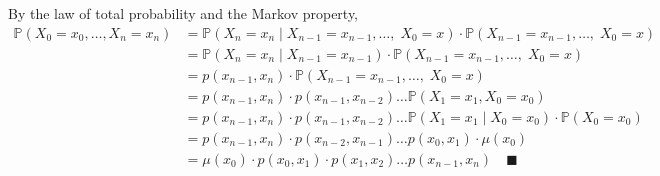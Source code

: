 \documentclass[11pt,letterpaper, leqno]{article}
\numberwithin{equation}{section}
\numberwithin{theorem}{section}
\numberwithin{lemma}{section}
\numberwithin{corollary}{section}
\numberwithin{definition}{section}
\numberwithin{proposition}{section}
\numberwithin{remark}{section}
\numberwithin{example}{section}
\renewcommand{\P}{\mathbb{P}}
\renewcommand{\qed}{\quad \blacksquare}
\begin{document}
\begin{enumerate}
        \color{blue}           
            By the law of total probability and the Markov property,
            \begin{align*}
                \mathbb{P}(X_0=x_0, \ldots, X_n=x_n) &= \P(X_n = x_n \; | \; X_{n-1} = x_{n-1}, \dots, \; X_0 = x)\cdot \P(X_{n-1} = x_{n-1}, \dots, \; X_0 = x)\\
                &= \P(X_{n} = x_{n} \; | \; X_{n-1} = x_{n-1}) \cdot \P(X_{n-1} = x_{n-1}, \dots, \; X_0 = x)\\
                &= p(x_{n-1}, x_n) \cdot \P(X_{n-1} = x_{n-1}, \dots, \; X_0 = x)\\
                &= p(x_{n-1}, x_n) \cdot p(x_{n-1}, x_{n-2}) \dots \P(X_1 = x_1, X_0 = x_0)\\
                &= p(x_{n-1}, x_n) \cdot p(x_{n-1}, x_{n-2}) \dots \P(X_1 = x_1 \; | \; X_0 = x_0) \cdot \P(X_0 = x_0)\\
                &= p(x_{n-1}, x_n) \cdot p(x_{n-2}, x_{n-1}) \dots p(x_0, x_1) \cdot \mu(x_0)\\
                &= \mu(x_0)\cdot p(x_0, x_1)\cdot p(x_1, x_2)\ldots p(x_{n-1}, x_n) \qed
            \end{align*}
        \color{black}
\end{enumerate}

%

\end{document}

